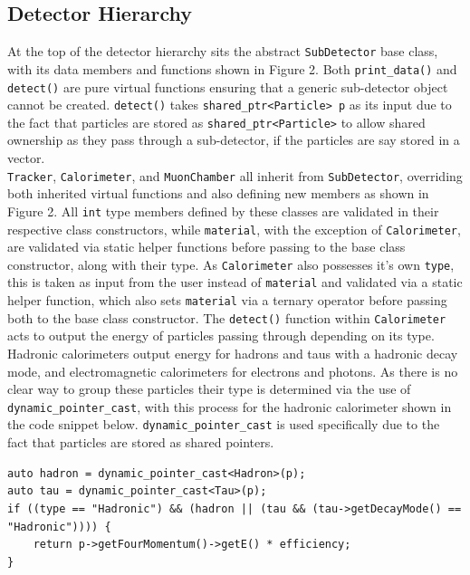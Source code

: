 \documentclass[12pt]{report}
\begin{document}
\subsection{Detector Hierarchy}

At the top of the detector hierarchy sits the abstract \texttt{SubDetector} base class, with its data members and functions shown in Figure 2. Both \texttt{print\_data()} and \texttt{detect()} are pure virtual functions ensuring that a generic sub-detector object cannot be created. \texttt{detect()} takes \texttt{shared\_ptr<Particle> p} as its input due to the fact that particles are stored as \texttt{shared\_ptr<Particle>} to allow shared ownership as they pass through a sub-detector, if the particles are say stored in a vector.\\

\texttt{Tracker}, \texttt{Calorimeter}, and \texttt{MuonChamber} all inherit from \texttt{SubDetector}, overriding both inherited virtual functions and also defining new members as shown in Figure 2. All \texttt{int} type members defined by these classes are validated in their respective class constructors, while \texttt{material}, with the exception of \texttt{Calorimeter}, are validated via static helper functions before passing to the base class constructor, along with their type. As \texttt{Calorimeter} also possesses it's own \texttt{type}, this is taken as input from  the user instead of \texttt{material} and validated via a static helper function, which also sets \texttt{material} via a ternary operator before passing both to the base class constructor. The \texttt{detect()} function within \texttt{Calorimeter} acts to output the energy of particles passing through depending on its type. Hadronic calorimeters output energy for hadrons and taus with a hadronic decay mode, and electromagnetic calorimeters for electrons and photons. As there is no clear way to group these particles their type is determined via the use of \texttt{dynamic\_pointer\_cast}, with this process for the hadronic calorimeter shown in the code snippet below. \texttt{dynamic\_pointer\_cast} is used specifically due to the fact that particles are stored as shared pointers. 
\begin{verbatim}
auto hadron = dynamic_pointer_cast<Hadron>(p);
auto tau = dynamic_pointer_cast<Tau>(p);
if ((type == "Hadronic") && (hadron || (tau && (tau->getDecayMode() == "Hadronic")))) {
    return p->getFourMomentum()->getE() * efficiency;
}
\end{verbatim}
\end{document}
